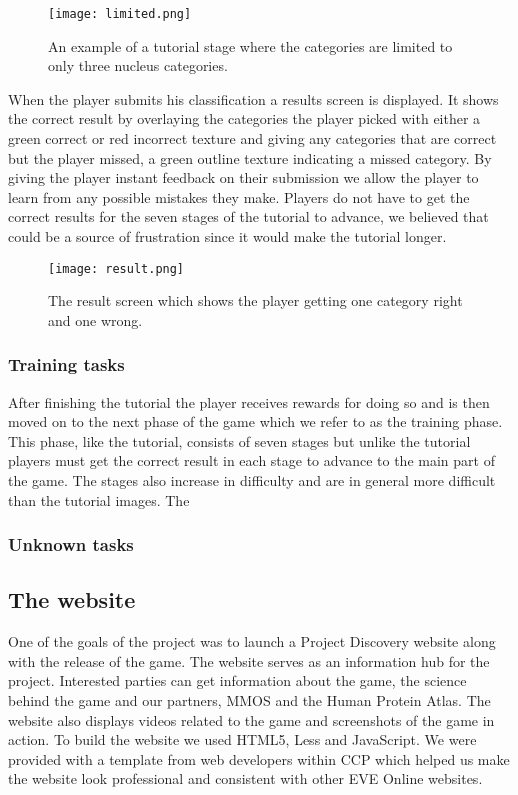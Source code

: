 		\begin{figure}[H]
		  \centering
		  \graphicspath{ {./graphics/} }
		  \centerline{\texttt{[image: limited.png]}}
		  \caption{\label{fig:limited}An example of a tutorial stage where the categories are limited to only three nucleus categories.}
		\end{figure}

		When the player submits his classification a results screen is displayed. It shows the correct result by overlaying the categories the player picked with either a green correct or red incorrect texture and giving any categories that are correct but the player missed, a green outline texture indicating a missed category. By giving the player instant feedback on their submission we allow the player to learn from any possible mistakes they make. Players do not have to get the correct results for the seven stages of the tutorial to advance, we believed that could be a source of frustration since it would make the tutorial longer. 

		\begin{figure}[H]
		  \centering
		  \graphicspath{ {./graphics/} }
		  \centerline{\texttt{[image: result.png]}}
		  \caption{\label{fig:result}The result screen which shows the player getting one category right and one wrong.}
		\end{figure}

	\subsubsection{Training tasks}
		After finishing the tutorial the player receives rewards for doing so and is then moved on to the next phase of the game which we refer to as the training phase. This phase, like the tutorial, consists of seven stages but unlike the tutorial players must get the correct result in each stage to advance to the main part of the game. The stages also increase in difficulty and are in general more difficult than the tutorial images. The 

	\subsubsection{Unknown tasks}

\subsection{The website}
	One of the goals of the project was to launch a Project Discovery website along with the release of the game. The website serves as an information hub for the project. Interested parties can get information about the game, the science behind the game and our partners, MMOS and the Human Protein Atlas. The website also displays videos related to the game and screenshots of the game in action. To build the website we used HTML5, Less and JavaScript. We were provided with a template from web developers within CCP which helped us make the website look professional and consistent with other EVE Online websites.

